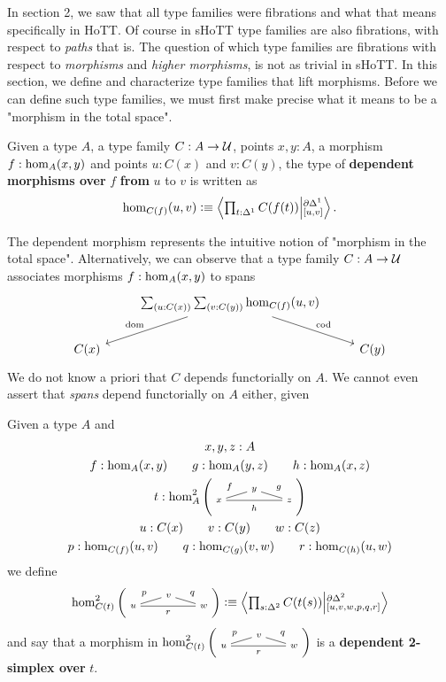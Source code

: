 \documentclass[main.tex]{subfiles}
\begin{document}
In section 2, we saw that all type families were fibrations and what that means specifically in HoTT. Of course in sHoTT type families are also fibrations, with respect to \textit{paths} that is. The question of which type families are fibrations with respect to \textit{morphisms} and \textit{higher morphisms}, is not as trivial in sHoTT. In this section, we define and characterize type families that lift morphisms. Before we can define such type families, we must first make precise what it means to be a "morphism in the total space".
\begin{definition}
Given a type $A$, a type family $C : A \to \U$, points $x,y : A$, a morphism $f : \ho[A]{x}{y}$ and points $u : C(x)$ and $v : C(y)$, the type of \textbf{dependent morphisms over} $f$ \textbf{from} $u$ to $v$ is written as $$
\dho{C}{f}{u}{v} \defeq \exten{t : \osx}{C(f(t))}{\pardo}{[u,v]}.$$
\end{definition}
The dependent morphism represents the intuitive notion of "morphism in the total space". Alternatively, we can observe that a type family $C: A \to \U$ associates morphisms $f : \ho[A]{x}{y}$ to spans
\[\begin{tikzcd}
	& {\sm{u:C(x)}{v:C(y)}\dho{C}{f}{u}{v}} \\
	{C(x)} && {C(y)}
	\arrow["\dom"', from=1-2, to=2-1]
	\arrow["\cod", from=1-2, to=2-3]
\end{tikzcd}\]
We do not know a priori that $C$ depends functorially on $A$. We cannot even assert that \textit{spans} depend functorially on $A$ either, given 
\begin{definition}
    Given a type $A$ and
    \begin{gather*}
                          x,y,z : A  \\
    f : \ho[A]{x}{y} \qquad g : \ho[A]{y}{z} \qquad h:\ho[A]{x}{z} \\
    t : \homtwo{A}(x,y,z,f,g,h)\\
    u : C(x) \qquad v : C(y) \qquad w : C(z) \\
    p : \dho{C}{f}{u}{v} \qquad q : \dho{C}{g}{v}{w} \qquad r : \dho{C}{h}{u}{w}
    \end{gather*}
    we define
    $$\homtwo{C(t)}(u,v,w,p,q,r) \defeq \exten{s : \tsx}{C(t(s))}{\pardt}{[u,v,w,p,q,r]}$$
    and say that a morphism in $\homtwo{C(t)}(u,v,w,p,q,r)$ is a \textbf{dependent 2-simplex over} $t$.
\end{definition}
\end{document}
